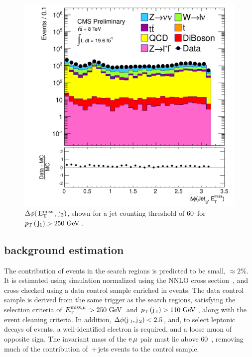 \begin{figure}[htbp!]
\begin{center}
 \includegraphics[scale=0.4]{Figures/sus13009/dPhi_MetLep_Jet3.pdf}
 \caption{ $\Delta \phi(\,\mathrm{E_{\text{T}}^{\text{miss}}\,}, \,\mathrm{j}_3)$, shown for a jet counting threshold of 60~\GeV for $p_{\text{T}}\,(\,\mathrm{j}_1) > 250~\mathrm{GeV}\,$.}
 \label{dphi_METj3}
 \end{center}
 \end{figure}


\subsection{\ttbar background estimation}
\label{sec:ttbar}
The contribution of \ttbar events in the search regions is predicted to be small, $\approx2\%$.
It is estimated using simulation normalized using the \ac{NNLO} cross section~\cite{ttbarxs}, 
and cross checked using a data control sample enriched in \ttbar events. 
The data control sample is derived from the same trigger as the search regions, satisfying the selection criteria of $E^{\rm miss, \mu}_{\rm T}\,>250~\mathrm{GeV}\,$ and $p_{\text{T}}\,({\rm j}\,_1)>110~\mathrm{GeV}\,$, along with the event cleaning criteria. 
In addition, $\Delta \phi({\rm j}\,_1, {\rm j}\,_2)<2.5$, and, to select leptonic decays of \ttbar events, 
a well-identified electron is required, and a loose muon of opposite sign. 
The invariant mass of the $\mathrm{e}\,\mu$ pair must lie above 60~\GeV, removing much of the contribution of \zellellbr\,+\,jets events to the control sample. 

